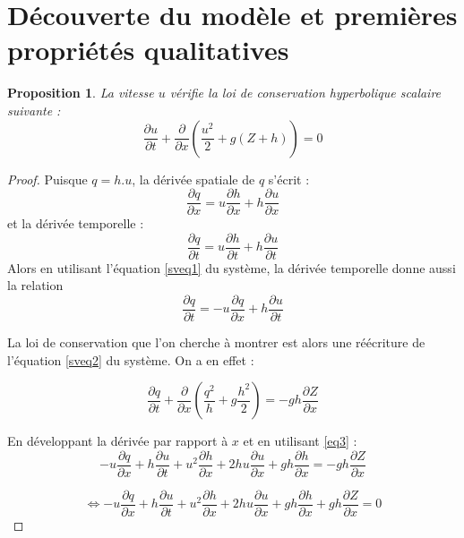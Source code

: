 \documentclass[
11pt, %
francais, %
singlespacing, %
headsepline, %
]{MastersDoctoralThesis} %
\newtheorem{prop}{Proposition}
\theoremstyle{definition}
\begin{document}
\section{Découverte du modèle et premières propriétés qualitatives}

\begin{prop} La vitesse $u$ vérifie la loi de conservation hyperbolique scalaire suivante : 
\begin{equation}
\frac{\partial u}{\partial t}+\frac{\partial}{\partial x}(\frac{u^{2}}{2}+g(Z+h))=0 \label{cl}
\end{equation}

\end{prop}

\begin{proof}
Puisque $q=h.u$, la dérivée spatiale de $q$ s'écrit : \begin{equation}\frac{\partial q}{\partial x} = u\frac{\partial h}{\partial x}+h\frac{\partial u}{\partial x} \label{eq1}\end{equation}
et la dérivée temporelle : \begin{equation} \frac{\partial q}{\partial t} =  u\frac{\partial h}{\partial t} +  h\frac{\partial u}{\partial t} \label{eq2} \end{equation}
Alors en utilisant l'équation \ref{sveq1} du système, la dérivée temporelle donne aussi la relation \begin{equation}  \frac{\partial q}{\partial t}=-u\frac{\partial q}{\partial x}+h\frac{\partial u}{\partial t} \label{eq3}\end{equation}

La loi de conservation que l'on cherche à montrer est alors une réécriture de l'équation \ref{sveq2} du système. On a en effet :

$$
\frac{\partial q}{\partial t} + \frac{\partial }{\partial x}(\frac{q^{2}}{h}+g\frac{h^{2}}{2}) = -gh\frac{\partial Z}{\partial x}
$$

En développant la dérivée par rapport à $x$ et en utilisant \eqref{eq3} : 
$$
-u\frac{\partial q}{\partial x}+h\frac{\partial u}{\partial t}+u^{2}\frac{\partial h }{\partial x}+2hu\frac{\partial u}{\partial x} +gh\frac{\partial h}{\partial x}= -gh\frac{\partial Z}{\partial x}
$$

$$
\Leftrightarrow -u\frac{\partial q}{\partial x}+h\frac{\partial u}{\partial t}+u^{2}\frac{\partial h }{\partial x}+2hu\frac{\partial u}{\partial x} +gh\frac{\partial h}{\partial x} + gh\frac{\partial Z}{\partial x} =0
$$


\end{proof}
\end{document}

